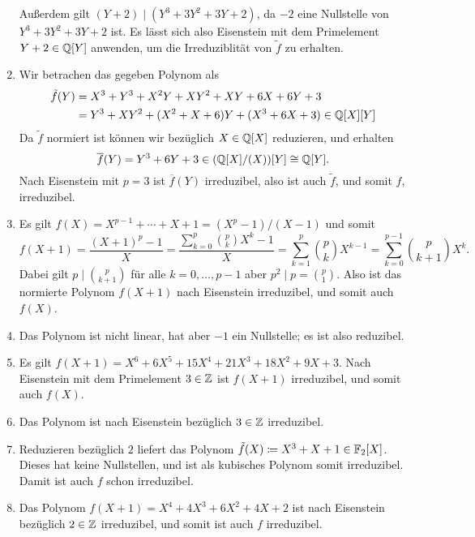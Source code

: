 \begin{solution}
\begin{enumerate}
      Außerdem gilt $(Y + 2) \mid (Y^3 + 3 Y^2 + 3 Y + 2)$, da $-2$ eine Nullstelle von $Y^3 + 3 Y^2 + 3 Y + 2$ ist.
      Es lässt sich also Eisenstein mit dem Primelement $Y + 2 \in \mathbb{Q}[Y]$ anwenden, um die Irreduziblität von $\tilde{f}$ zu erhalten.
    \item
      Wir betrachen das gegeben Polynom als
      \begin{align*}
            \tilde{f}(Y)
        &=  X^3 + Y^3 + X^2 Y + X Y^2 + X Y + 6 X + 6 Y + 3
        \\
        &=  Y^3 + X Y^2 + (X^2 + X + 6) Y + (X^3 + 6X + 3)
        \in \mathbb{Q}[X][Y]
      \end{align*}
      Da $\tilde{f}$ normiert ist können wir bezüglich $X \in \mathbb{Q}[X]$ reduzieren, und erhalten
      \[
              \overline{f}(Y)
        =     Y^3 + 6 Y + 3
        \in   (\mathbb{Q}[X]/(X))[Y]
        \cong \mathbb{Q}[Y].
      \]
      Nach Eisenstein mit $p = 3$ ist $\overline{f}(Y)$ irreduzibel, also ist auch $\tilde{f}$, und somit $f$, irreduzibel.
    \item
      Es gilt $f(X) = X^{p-1} + \dotsb + X + 1 = (X^p - 1)/(X - 1)$ und somit
      \[
          f(X+1)
        = \frac{(X+1)^p-1}{X}
        = \frac{\sum_{k=0}^p \binom{p}{k} X^k - 1}{X}
        = \sum_{k=1}^p \binom{p}{k} X^{k-1}
        = \sum_{k=0}^{p-1} \binom{p}{k+1} X^k.
      \]
      Dabei gilt $p \mid \binom{p}{k+1}$ für alle $k = 0, \dotsc, p-1$ aber $p^2 \mid p = \binom{p}{1}$.
      Also ist das normierte Polynom $f(X+1)$ nach Eisenstein irreduzibel, und somit auch $f(X)$.
    \item
      Das Polynom ist nicht linear, hat aber $-1$ ein Nullstelle; es ist also reduzibel.
    \item
      Es gilt $f(X+1) = X^6 + 6 X^5 + 15 X^4 + 21 X^3 + 18 X^2 + 9 X + 3$.
      Nach Eisenstein mit dem Primelement $3 \in \mathbb{Z}$ ist $f(X+1)$ irreduzibel, und somit auch $f(X)$.
    \item
      Das Polynom ist nach Eisenstein bezüglich $3 \in \mathbb{Z}$ irreduzibel.
    \item
      Reduzieren bezüglich $2$ liefert das Polynom $\tilde{f}(X) \coloneqq X^3 + X + 1 \in \mathbb{F}_2[X]$.
      Dieses hat keine Nullstellen, und ist als kubisches Polynom somit irreduzibel.
      Damit ist auch $f$ schon irreduzibel.
    \item
      Das Polynom $f(X+1) = X^4 + 4 X^3 + 6 X^2 + 4 X + 2$ ist nach Eisenstein bezüglich $2 \in \mathbb{Z}$ irreduzibel, und somit ist auch $f$ irreduzibel.
  \end{enumerate}
\end{solution}


